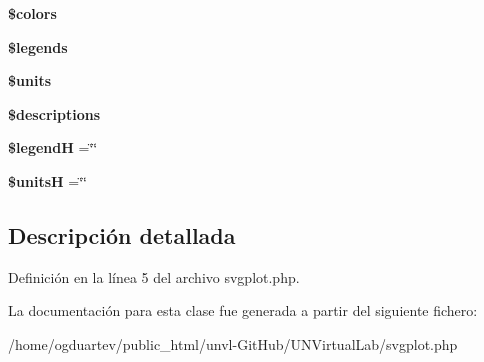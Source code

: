 \begin{DoxyCompactItemize}
{\bfseries \$colors}
\item 
\mbox{\label{classSVGplot_a8893ea8511edcdad8a90cace54db09b1}} 
{\bfseries \$legends}
\item 
\mbox{\label{classSVGplot_a8d000e306c896835b1e8aab693e1772a}} 
{\bfseries \$units}
\item 
\mbox{\label{classSVGplot_a60a60e1c751277eb8db37bf9fdc60c79}} 
{\bfseries \$descriptions}
\item 
\mbox{\label{classSVGplot_aef827b465ef1dbc6c2e3dd72496eba7e}} 
{\bfseries \$legendH} =\char`\"{}\char`\"{}
\item 
\mbox{\label{classSVGplot_a03724d0202bd3c8a1ee866deea738377}} 
{\bfseries \$unitsH} =\char`\"{}\char`\"{}
\end{DoxyCompactItemize}


\subsection{Descripción detallada}


Definición en la línea 5 del archivo svgplot.\+php.



La documentación para esta clase fue generada a partir del siguiente fichero\+:\begin{DoxyCompactItemize}
\item 
/home/ogduartev/public\+\_\+html/unvl-\/\+Git\+Hub/\+U\+N\+Virtual\+Lab/svgplot.\+php\end{DoxyCompactItemize}
